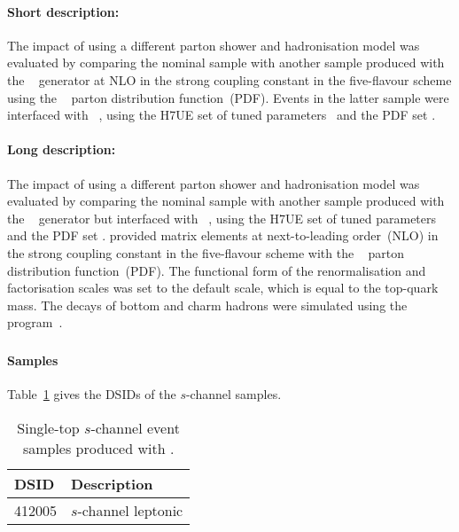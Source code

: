 \paragraph{Short description:}

The impact of using a different parton shower and hadronisation model was evaluated by comparing the nominal sample
with another sample produced with the \POWHEGBOX[v2]~\cite{Alioli:2009je,Nason:2004rx,Frixione:2007vw,Alioli:2010xd}
generator at NLO in the strong coupling constant \alphas in the five-flavour scheme using the 
\NNPDF[3.0nlo]~\cite{Ball:2014uwa} parton distribution function~(PDF).
Events in the latter sample were interfaced with \HERWIG[7.04]~\cite{Bahr:2008pv,Bellm:2015jjp}, using the H7UE set of
tuned parameters~\cite{Bellm:2015jjp} and the \MMHT[lo] PDF set \cite{Harland-Lang:2014zoa}.

\paragraph{Long description:}

The impact of using a different parton shower and hadronisation model was evaluated by comparing the nominal sample
with another sample produced with the \POWHEGBOX[v2]~\cite{Alioli:2009je,Nason:2004rx,Frixione:2007vw,Alioli:2010xd}
generator but interfaced with \HERWIG[7.04]~\cite{Bahr:2008pv,Bellm:2015jjp}, using the H7UE set of
tuned parameters~\cite{Bellm:2015jjp} and the \MMHT[lo] PDF set \cite{Harland-Lang:2014zoa}.
\POWHEGBOX provided matrix elements at next-to-leading order~(NLO) in the strong coupling constant \alphas
in the five-flavour scheme with the \NNPDF[3.0nlo]~\cite{Ball:2014uwa} parton distribution function~(PDF).
The functional form of the renormalisation and factorisation scales was set to the default scale, which is equal to the top-quark mass.
The decays of bottom and charm hadrons were simulated using the \EVTGEN[1.6.0] program~\cite{Lange:2001uf}.

\subsubsection[MadGraph5\_aMC@NLO+Pythia8]{\MGNLOPY[8]}
\label{subsubsec:schan_aMCP8}

\paragraph{Samples}

Table~\ref{tab:schan_aMCP8} gives the DSIDs of the $s$-channel \MGNLOPY[8] samples.
\begin{table}[htbp]
\begin{center}
\caption{Single-top $s$-channel event samples produced with \MGNLOPY[8].} 
\label{tab:schan_aMCP8}
\begin{tabular}{ l | l }
\hline
DSID & Description \\
\hline
412005 & $s$-channel leptonic \\
\hline
\end{tabular}
\end{center}
\end{table}

